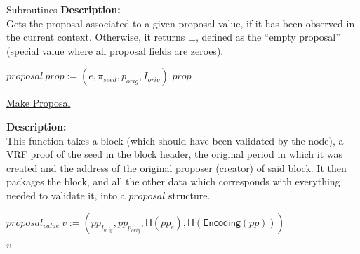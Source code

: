 \documentclass[10pt,a4paper]{article}
\begin{document}
\begin{section}{Subroutines}
\noindent \textbf{Description:}\\ Gets the proposal associated to a given proposal-value, 
if it has been observed in the current context.
Otherwise, it returns $\bot$, defined as the ``empty proposal'' (special value where all
proposal fields are zeroes).

\begin{algorithm}[H]
    \begin{algorithmic}[1]

        \State $proposal \ prop := (e, \pi_{seed}, p_{orig}, I_{orig})$
        \Return $prop$

    \EndFunction
    \end{algorithmic}
    \caption{\underline{Make Proposal}}
\end{algorithm}


\noindent \textbf{Description:}\\ This function takes a block (which should have been validated by the node),
a VRF proof of the seed in the block header, the original period in which it was created and the address of the
original proposer (creator) of said block. It then packages the block, and all the other data which corresponds
with everything needed to validate it, into a $proposal$ structure.

\begin{algorithm}[H]\label{proposal-value}
    \begin{algorithmic}[1]

    \State $proposal_{value} \ v := (pp_{I_{orig}}, pp_{p_{orig}}, \mathsf{H}(pp_e), \mathsf{H}(\mathsf{Encoding}(pp)))$

    \State \Return $v$


\end{algorithmic}
\end{algorithm}
\end{section}
\end{document}

